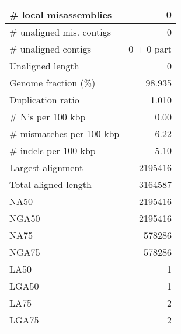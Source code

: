 \documentclass[12pt,a4paper]{article}
\begin{document}
\begin{table}[ht]
\begin{center}
\begin{tabular}{|l*{1}{|r}|}
\# local misassemblies & 0 \\ \hline
\# unaligned mis. contigs & 0 \\ \hline
\# unaligned contigs & 0 + 0 part \\ \hline
Unaligned length & 0 \\ \hline
Genome fraction (\%) & 98.935 \\ \hline
Duplication ratio & 1.010 \\ \hline
\# N's per 100 kbp & 0.00 \\ \hline
\# mismatches per 100 kbp & 6.22 \\ \hline
\# indels per 100 kbp & 5.10 \\ \hline
Largest alignment & 2195416 \\ \hline
Total aligned length & 3164587 \\ \hline
NA50 & 2195416 \\ \hline
NGA50 & 2195416 \\ \hline
NA75 & 578286 \\ \hline
NGA75 & 578286 \\ \hline
LA50 & 1 \\ \hline
LGA50 & 1 \\ \hline
LA75 & 2 \\ \hline
LGA75 & 2 \\ \hline
\end{tabular}
\end{center}
\end{table}
\end{document}
